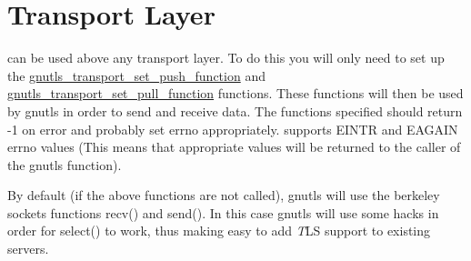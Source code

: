 \section{Transport Layer}
\par
\gnutls can be used above any transport layer. To do this you will only 
need to set up the 
\hyperref{gnutls\_transport\_set\_push\_function()}{gnutls\_transport\_set\_push\_function() (see Section }{
for more information)}{gnutls_transport_set_push_function} and
\hyperref{gnutls\_transport\_set\_pull\_function()}{gnutls\_transport\_set\_pull\_function() (see Section }{
for more information)}{gnutls_transport_set_pull_function}
functions. These functions will then be used by gnutls in order to send and receive data.
The functions specified should return -1 on error and probably set errno appropriately.
\gnutls supports EINTR and EAGAIN errno values (This means that appropriate
values will be returned to the caller of the gnutls function).
\par
By default (if the above functions are not called), gnutls will use
the berkeley sockets functions recv() and send(). In this case
gnutls will use some hacks in order for select() to work, thus
making easy to add {\emph TLS} support to existing servers.


